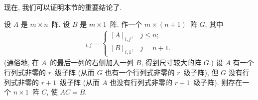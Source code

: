 现在, 我们可以证明本节的重要结论了.

\begin{theorem}
    设 \(A\) 是 \(m \times n\)~阵.
    设 \(B\) 是 \(m \times 1\)~阵.
    作一个 \(m \times (n+1)\)~阵 \(G\),
    其中
    \begin{align*}
        [G]_{i,j}
        = \begin{cases}
              [A]_{i,j}, & j \leq n;  \\
              [B]_{i,1}, & j = n + 1.
          \end{cases}
    \end{align*}
    (通俗地, 在 \(A\)~的最后一列的右侧加入一列 \(B\),
    得到尺寸较大的阵 \(G\).)
    设
    \(A\) 有一个行列式非零的 \(r\)~级子阵
    (从而 \(G\) 也有一个行列式非零的 \(r\)~级子阵),
    但 \(G\) 没有行列式非零的 \(r+1\)~级子阵
    (从而 \(A\) 也没有行列式非零的 \(r+1\)~级子阵).
    则存在一个 \(n \times 1\)~阵 \(C\),
    使 \(AC = B\).
\end{theorem}

